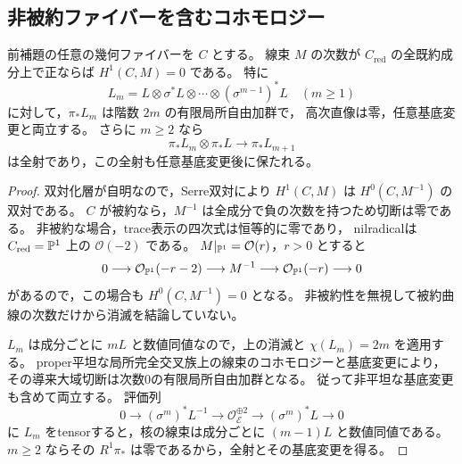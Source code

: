 \subsection{非被約ファイバーを含むコホモロジー}

\begin{lemma}\label{lem:degree-two-double-cover-cohomology}
前補題の任意の幾何ファイバーを $C$ とする。
線束 $M$ の次数が $C_{\mathrm{red}}$ の全既約成分上で正ならば
$H^1(C,M)=0$ である。
特に
\[
 L_m=L\otimes\sigma^*L\otimes\cdots\otimes(\sigma^{m-1})^*L
 \quad(m\ge1)
\]
に対して，$\pi_*L_m$ は階数 $2m$ の有限局所自由加群で，
高次直像は零，任意基底変更と両立する。
さらに $m\ge2$ なら
\[
 \pi_*L_m\otimes\pi_*L\longrightarrow\pi_*L_{m+1}
\]
は全射であり，この全射も任意基底変更後に保たれる。
\end{lemma}
\begin{proof}
双対化層が自明なので，Serre双対により $H^1(C,M)$ は
$H^0(C,M^{-1})$ の双対である。
$C$ が被約なら，$M^{-1}$ は全成分で負の次数を持つため切断は零である。
非被約な場合，trace表示の四次式は恒等的に零であり，
nilradicalは $C_{\mathrm{red}}=\mathbb P^1$ 上の $\mathcal O(-2)$ である。
$M|_{\mathbb P^1}=\mathcal O(r)$，$r>0$ とすると
\[
 0\longrightarrow\mathcal O_{\mathbb P^1}(-r-2)
   \longrightarrow M^{-1}
   \longrightarrow\mathcal O_{\mathbb P^1}(-r)\longrightarrow0
\]
があるので，この場合も $H^0(C,M^{-1})=0$ となる。
非被約性を無視して被約曲線の次数だけから消滅を結論していない。

$L_m$ は成分ごとに $mL$ と数値同値なので，上の消滅と
$\chi(L_m)=2m$ を適用する。
proper平坦な局所完全交叉族上の線束のコホモロジーと基底変更により，
その導来大域切断は次数0の有限局所自由加群となる。
従って非平坦な基底変更も含めて両立する。
評価列
\[
 0\longrightarrow (\sigma^m)^*L^{-1}
  \longrightarrow\mathcal O_{\mathcal E}^{\oplus2}
  \longrightarrow(\sigma^m)^*L\longrightarrow0
\]
に $L_m$ をtensorすると，核の線束は成分ごとに $(m-1)L$ と数値同値である。
$m\ge2$ ならその $R^1\pi_*$ は零であるから，全射とその基底変更を得る。
\end{proof}

